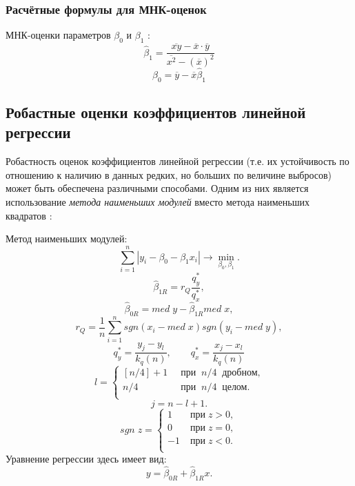 \documentclass[12pt]{article}
\begin{document}
    \subsubsection{Расчётные формулы для МНК-оценок}
    МНК-оценки параметров $\beta_0$ и $\beta_1$ \cite{lit1}:
    \begin{equation}
        \hat{\beta}_1 = \frac{\overline{xy} - \overline{x} \cdot \overline{y}}{\overline{x^2} - (\overline{x})^2}
     \label{beta1}
    \end{equation}
    \begin{equation}
        \hat{\beta}_0 = \overline{y} - \overline{x}\hat{\beta}_1
      \label{beta0}
    \end{equation}

\subsection{Робастные оценки коэффициентов линейной регрессии}
Робастность оценок коэффициентов линейной регрессии (т.е. их устойчивость по отношению к наличию в данных редких, но больших по величине выбросов) может быть обеспечена различными способами. Одним из них является использование {\it метода наименьших модулей} вместо метода наименьших квадратов  \cite{lit1} :
\vskip 0.3cm
\par Метод наименьших модулей:
\begin{equation}\label{mnm}
    \sum_{i = 1}^{n}|y_i - \beta_0 - \beta_1x_i| \rightarrow \min_{\beta_0, \beta_1}.
\end{equation}
\begin{equation}
    \hat{\beta}_{1R} = r_Q\frac{q^{*}_{y}}{q^{*}_{x}},
    \label{mnm1}
\end{equation}
\begin{equation}
    \hat{\beta}_{0R} = med \; y - \hat{\beta}_{1R} med \; x,
    \label{mnm0}
\end{equation}
\begin{equation}
    r_Q = \frac{1}{n}\sum_{i=1}^{n}sgn(x_i - med \; x)sgn(y_i - med \; y),
\end{equation}
\begin{equation}
    q^{*}_{y} = \frac{y_j - y_l}{k_q(n)}, \qquad q^{*}_{x} = \frac{x_j - x_l}{k_q(n)}
\end{equation}
\[
    l = 
		\left\{
		\begin{aligned}
			 \left[n/4\right] + 1& \;\; \text{при} \;\; n/4 \;\; \text{дробном,}\\
			 n/4                  & \;\; \text{при} \;\; n/4 \;\; \text{целом.}\\
		\end{aligned}
		\right.
\]
\[
    j = n - l + 1.
\]
\[
    sgn \; z = 
		\left\{
		\begin{aligned}
			 1 & \; \text{при} \; z > 0,\\
             0 & \; \text{при} \; z = 0,\\
             -1 & \; \text{при} \; z < 0.\\
		\end{aligned}
		\right.
\]
Уравнение регрессии здесь имеет вид:
\begin{equation}
    y = \hat{\beta}_{0R} + \hat{\beta}_{1R}x.
\end{equation}
\end{document}
